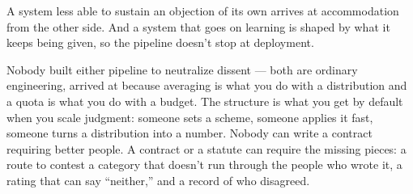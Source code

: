 A system less able to sustain an objection of its own arrives at accommodation from the other side. And a system that goes on learning is shaped by what it keeps being given, so the pipeline doesn't stop at deployment.


Nobody built either pipeline to neutralize dissent — both are ordinary engineering, arrived at because averaging is what you do with a distribution and a quota is what you do with a budget. The structure is what you get by default when you scale judgment: someone sets a scheme, someone applies it fast, someone turns a distribution into a number.
Nobody can write a contract requiring better people. A contract or a statute can require the missing pieces: a route to contest a category that doesn't run through the people who wrote it, a rating that can say “neither,” and a record of who disagreed.
